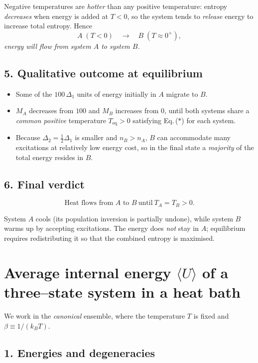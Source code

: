 \documentclass[12pt]{article}
\theoremstyle{definition} %
\theoremstyle{plain} %
\begin{document}
Negative temperatures are \emph{hotter} than any positive temperature:
entropy \emph{decreases} when energy is added at \(T<0\), so the system
tends to \emph{release} energy to increase total entropy.
Hence
\[
  A\;(T<0)\quad\longrightarrow\quad B\;(T\approx 0^{+}),
\]
\emph{energy will flow from system \(A\) to system \(B\).}

\subsection*{5.  Qualitative outcome at equilibrium}

\begin{itemize}
  \item Some of the \(100\,\Delta_1\) units of energy initially in \(A\)
        migrate to \(B\).
  \item \(M_A\) decreases from \(100\) and \(M_B\) increases from \(0\),
        until both systems share a \emph{common positive} temperature
        \(T_{\text{eq}}>0\) satisfying Eq.\,($\ast$) for each system.
  \item Because \(\Delta_2=\tfrac12\Delta_1\) is smaller and
        \(n_B>n_A\), \(B\) can accommodate many excitations at relatively
        low energy cost, so in the final state a \emph{majority} of the
        total energy resides in \(B\).
\end{itemize}

\subsection*{6.  Final verdict}

\[
  \boxed{\text{Heat flows from }A\text{ to }B\ \text{until}\ T_A=T_B>0.}
\]

System \(A\) cools (its population inversion is partially undone),
while system \(B\) warms up by accepting excitations.  The energy does
\emph{not} stay in \(A\); equilibrium requires redistributing it so that
the combined entropy is maximised.
\section*{Average internal energy \(\langle U\rangle\) of a three–state system in a heat bath}

We work in the \emph{canonical} ensemble, where the temperature \(T\) is fixed and  
\(\beta \equiv 1/(k_B T)\).

\subsection*{1.  Energies and degeneracies}
\end{document}
